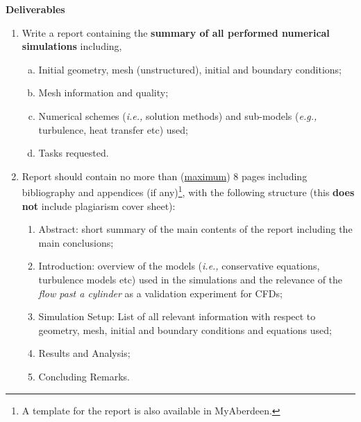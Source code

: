 \documentclass[12pts,a4paper,amsmath,amssymb,floatfix]{article}%
\newcommand{\eg}{{\it e.g., }}
\newcommand{\ie}{{\it i.e., }}
\begin{document}
\clearpage
\begin{center} \Large{\bf Deliverables}\end{center}
\begin{enumerate}[1)]
  \item Write a report containing the {\bf summary of all performed numerical simulations} including,
       \begin{enumerate} [(a)]
          \item Initial geometry, mesh (unstructured), initial and boundary conditions;
          \item Mesh information and quality;
          \item Numerical schemes (\ie solution methods) and sub-models (\eg turbulence, heat transfer etc) used;
          \item Tasks requested.
     \end{enumerate}

     \item Report should contain no more than (\underline{maximum}) 8 pages including bibliography and appendices (if any)\footnote{A template for the report is also available in MyAberdeen.}, with the following structure (this {\bf does not} include plagiarism cover sheet):
       \begin{enumerate}
          \item Abstract: short summary of the main contents of the report including the main conclusions;
          \item Introduction: overview of the models (\ie conservative equations, turbulence models etc) used in the simulations and the relevance of the {\it flow past a cylinder} as a validation experiment for CFDs;
          \item Simulation Setup: List of all relevant information with respect to geometry, mesh, initial and boundary conditions and equations used;
          \item Results and Analysis;
          \item Concluding Remarks.
       \end{enumerate}



\end{enumerate}
\end{document}
